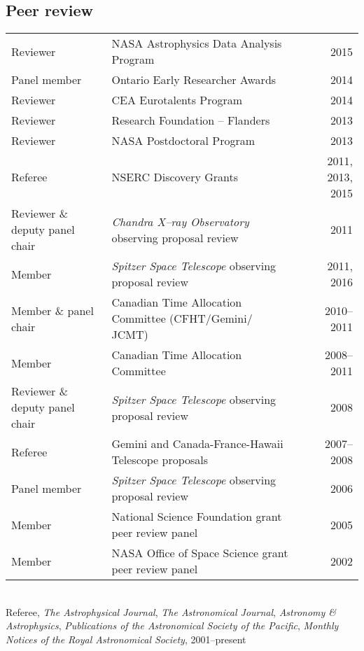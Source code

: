 \documentclass[12pt]{article}
\begin{document}
\subsection{Peer review}
\begin{tabularx}{\textwidth}{lXr}
Reviewer& NASA Astrophysics Data Analysis Program& 2015\\
Panel member & Ontario Early Researcher Awards & 2014\\
Reviewer&  CEA Eurotalents Program & 2014\\
Reviewer& Research Foundation -- Flanders& 2013\\
Reviewer& NASA Postdoctoral Program& 2013\\
Referee& NSERC Discovery Grants& 2011, 2013, 2015\\
Reviewer \& deputy panel chair& {\it Chandra X--ray Observatory\/} observing proposal review& 2011\\
Member& {\it Spitzer Space Telescope\/} observing proposal review& 2011, 2016\\
Member \& panel chair& Canadian Time Allocation Committee (CFHT/Gemini/ JCMT)& 2010--2011\\
Member& Canadian Time Allocation Committee& 2008--2011\\
Reviewer \& deputy panel chair& {\it Spitzer Space Telescope\/} observing proposal review& 2008\\
Referee& Gemini and Canada-France-Hawaii Telescope proposals& 2007--2008\\
Panel member& {\it Spitzer Space Telescope\/} observing proposal review& 2006\\
Member& National Science Foundation grant peer review panel& 2005\\
Member& NASA Office of Space Science grant peer review panel& 2002\\
\end{tabularx}\\
\vspace{0.3cm}
Referee, {\it The Astrophysical Journal}, {\it The Astronomical Journal}, {\it Astronomy \& Astrophysics},
{\it Publications of the Astronomical Society of the Pacific}, {\it Monthly Notices of the Royal Astronomical Society},
2001--present
\end{document}
